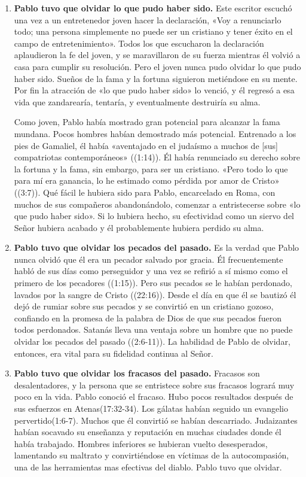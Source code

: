 \documentclass[12pt, twoside, openright]{book}
\begin{document}
\begin{enumerate}
\item \textbf{Pablo tuvo que olvidar lo que pudo haber sido.} Este escritor escuchó una vez a un entretenedor joven hacer la declaración, «Voy a renunciarlo todo; una persona simplemente no puede ser un cristiano y tener éxito en el campo de entretenimiento». Todos los que escucharon la declaración aplaudieron la fe del joven, y se maravillaron de su fuerza mientras él volvió a casa para cumplir su resolución. Pero el joven nunca pudo olvidar lo que pudo haber sido. Sueños de la fama y la fortuna siguieron metiéndose en su mente. Por fin la atracción de «lo que pudo haber sido» lo venció, y él regresó a esa vida que zandarearía, tentaría, y eventualmente destruiría su alma. 

Como joven, Pablo había mostrado gran potencial para alcanzar la fama mundana. Pocos hombres habían demostrado más potencial. Entrenado a los pies de Gamaliel, él había «aventajado en el judaísmo a muchos de [sus] compatriotas contemporáneos» ((1:14)). Él había renunciado su derecho sobre la fortuna y la fama, sin embargo, para ser un cristiano. «Pero todo lo que para mí era ganancia, lo he estimado como pérdida por amor de Cristo» ((3:7)). Qué fácil le hubiera sido para Pablo, encarcelado en Roma, con muchos de sus compañeros abandonándolo, comenzar a entristecerse sobre «lo que pudo haber sido». Si lo hubiera hecho, su efectividad como un siervo del Señor hubiera acabado y él probablemente hubiera perdido su alma. 
\item \textbf{Pablo tuvo que olvidar los pecados del pasado.} Es la verdad que Pablo nunca olvidó que él era un pecador salvado por gracia. Él frecuentemente habló de sus días como perseguidor y una vez se refirió a sí mismo como el primero de los pecadores ((1:15)). Pero sus pecados se le habían perdonado, lavados por la sangre de Cristo ((22:16)). Desde el día en que él se bautizó él dejó de rumiar sobre sus pecados y se convirtió en un cristiano gozoso, confiando en la promesa de la palabra de Dios de que sus pecados fueron todos perdonados. Satanás lleva una ventaja sobre un hombre que no puede olvidar los pecados del pasado ((2:6-11)). La habilidad de Pablo de olvidar, entonces, era vital para su fidelidad continua al Señor.
\item \textbf{Pablo tuvo que olvidar los fracasos del pasado.} Fracasos son desalentadores, y la persona que se entristece sobre sus fracasos logrará muy poco en la vida. Pablo conoció el fracaso. Hubo pocos resultados después de sus esfuerzos en Atenas(17:32-34). Los gálatas habían seguido un evangelio pervertido(1:6-7). Muchos que él convirtió se habían descarriado. Judaizantes habían socavado su enseñanza y reputación en muchas ciudades donde él había trabajado. Hombres inferiores se hubieran vuelto desesperados, lamentando su maltrato y convirtiéndose en víctimas de la autocompasión, una de las herramientas mas efectivas del diablo. Pablo tuvo que olvidar.

\end{enumerate}
\end{document}
